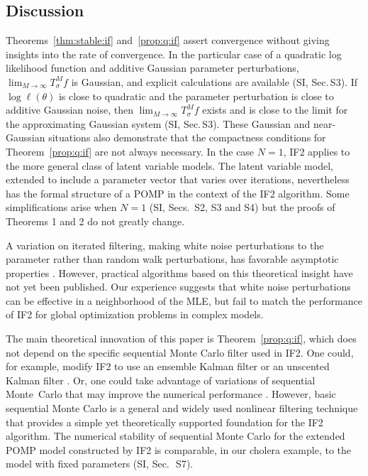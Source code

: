 \documentclass{pnastwo}\usepackage[]{graphicx}\usepackage[]{color}
\newcommand\secIIS{S2}
\newcommand\secGaussianIIS{S3}
\newcommand\secConjugacy{S4}
\newcommand\SupSecESS{S7}
\newcommand\mySection{{Sec.$\,$}}
\newcommand\mytheta{\theta}
\newcommand\lik{\ell}
\newcommand\IF{IF2}
\begin{document}
\begin{article}
\section{Discussion}\label{sec:discussion}

Theorems~\ref{thm:stable:if} and~\ref{prop:q:if} assert convergence without giving insights into the rate of convergence. 
In the particular case of a quadratic log likelihood function and additive Gaussian parameter perturbations, $\lim_{M\to\infty}T_\sigma^M f$ is Gaussian, and explicit calculations are available (SI, {\mySection}{\secGaussianIIS}). 
If $\log\lik(\mytheta)$  is close to quadratic and the parameter perturbation is close to additive Gaussian noise, then $\lim_{M\to\infty}T^M_\sigma f$ exists and is close to the limit for the approximating Gaussian system (SI, {\mySection}{\secGaussianIIS}).
These Gaussian and near-Gaussian situations also demonstrate that the compactness conditions for Theorem~\ref{prop:q:if} are not always necessary.
In the case $N=1$, IF2 applies to the more general class of latent variable models.
The latent variable model, extended to include a parameter vector that varies over iterations, nevertheless has the formal structure of a POMP in the context of the IF2 algorithm.
Some simplifications arise when $N=1$ (SI, Secs.~\secIIS, {\secGaussianIIS} and \secConjugacy) but the proofs of Theorems 1 and 2 do not greatly change.

A variation on iterated filtering, making white noise perturbations to the parameter rather than random walk perturbations, has favorable asymptotic properties \cite{doucet13}. 
However, practical algorithms based on this theoretical insight have not yet been published.
Our experience suggests that white noise perturbations can be effective in a neighborhood of the MLE, but fail to match the performance of IF2 for global optimization problems in complex models.

The main theoretical innovation of this paper is Theorem~\ref{prop:q:if}, which does not depend on the specific sequential Monte Carlo filter used in  {\IF}. One could, for example, modify  {\IF} to use an ensemble Kalman filter \cite{shaman12,yang14} or an unscented Kalman filter \cite{julier04}. 
Or, one could take advantage of variations of sequential Monte~Carlo that may improve the numerical performance \cite{cappe07}.
However, basic sequential Monte Carlo is a general and widely used nonlinear filtering technique that provides a simple yet theoretically supported foundation for the {\IF} algorithm. 
The numerical stability of sequential Monte Carlo for the extended POMP model constructed by {\IF} is comparable, in our cholera example, to the model with fixed parameters (SI, {\mySection}~\SupSecESS). 



\end{article}
\end{document}
